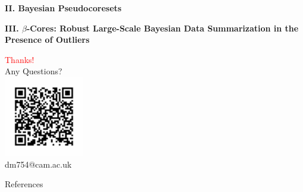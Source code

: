 \documentclass[hyperref={colorlinks = true},unknownkeysallowed]{beamer}
\makeatletter
\def\blfootnote{\xdef\@thefnmark{}\@footnotetext}
\makeatother
\begin{document}
\begin{frame}
	\LARGE{\textbf{II. Bayesian Pseudocoresets}}
\end{frame}


\begin{frame}
	\LARGE{\textbf{III. $\beta$-Cores: Robust Large-Scale Bayesian Data Summarization in the Presence of Outliers}}
\end{frame}



\begin{frame}
	\begin{center}
		\centering
		\Fontvilarge
		\textcolor{red}{Thanks!} \\
		\vspace{0.15cm}
		Any Questions? \\ 
		\vspace{0.15cm}
		\includegraphics[width=3.5cm,height=3.5cm]{qr.png} \\ 
		\vspace{0.25cm}
		dm754@cam.ac.uk
	\end{center}
\end{frame}


\begin{frame}[allowframebreaks]{References}
	\tiny %
	
\end{frame}
\end{document}
